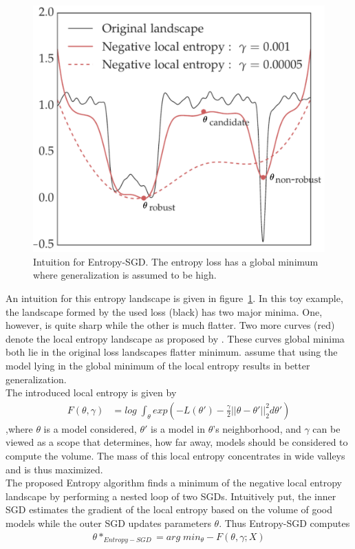\documentclass[a4paper]{scrartcl}
\begin{document}
\begin{figure}[H]
	\centering
	\includegraphics[width=.6\linewidth]{figures/entropy_1.pdf}
	\caption{Intuition for Entropy-SGD. The entropy loss has a global minimum where generalization is assumed to be high.}
	\label{fig:entropy}
\end{figure}
An intuition for this entropy landscape is given in figure~\ref{fig:entropy}. In this toy example, the landscape formed by the used loss (black) has two major minima. One, however, is quite sharp while the other is much flatter. Two more curves (red) denote the local entropy landscape as proposed by \citet{chaudhari2019entropy}. These curves global minima both lie in the original loss landscapes flatter minimum. \citet{chaudhari2019entropy} assume that using the model lying in the global minimum of the local entropy results in better generalization.\\
The introduced local entropy is given by
\begin{align}
	F(\theta, \gamma) &= log\; \int_\theta exp(-L(\theta') - \frac{\gamma}{2}||\theta-\theta'||_2^2 d\theta') 
\end{align},where $\theta$ is a model considered, $\theta'$ is a model in $\theta$'s neighborhood, and $\gamma$ can be viewed as a scope that determines, how far away, models should be considered to compute the volume. The mass of this local entropy concentrates in wide valleys and is thus maximized.\\
The proposed Entropy algorithm finds a minimum of the negative local entropy landscape by performing a nested loop of two SGDs. Intuitively put, the inner SGD estimates the gradient of the local entropy based on the volume of good models while the outer SGD updates parameters $\theta$. Thus Entropy-SGD computes
\begin{align*}
	\theta*_{Entropy-SGD} = arg\;min_{\theta} - F(\theta, \gamma; X)
\end{align*}
\end{document}
